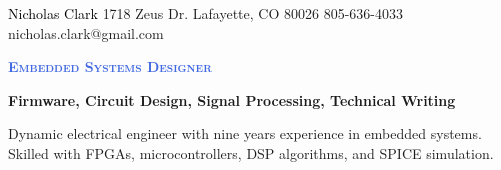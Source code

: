 \documentclass[letterpaper, 10pt]{article}
\newcommand{\NrcColorName}{Black}
\newcommand{\NrcColorTitle}{RoyalBlue}
\begin{document}
%
\nrctitle
{\textcolor{\NrcColorName}{Nicholas Clark}}
{1718 Zeus Dr.}
{Lafayette, CO 80026}
{805-636-4033}
{nicholas.clark@gmail.com}
%
\begin{center}\par\smallskip
\textcolor{\NrcColorTitle}{\Large \textbf{\textsc{Embedded Systems Designer}}}\par
\large \textbf{{Firmware, Circuit Design, Signal Processing, Technical Writing}}\par
\smallskip
\noindent \begin{minipage}[t]{0.75\textwidth}%
\begin{sloppypar}
Dynamic electrical engineer with nine years experience in embedded systems. 
Skilled with FPGAs, microcontrollers, DSP algorithms, and SPICE simulation.
\end{sloppypar}
\end{minipage}
\end{center}
\par \smallskip \smallskip
%
%
\end{document}
